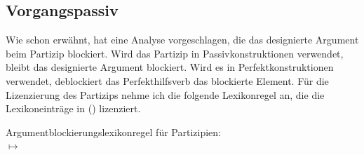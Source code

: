 \subsection{Vorgangspassiv}
\label{sec-agentive-passive-da}
\largerpage

Wie schon erwähnt, hat \citet{Haider86} eine Analyse vorgeschlagen, die das designierte Argument
beim Partizip blockiert. Wird das Partizip in Passivkonstruktionen verwendet, bleibt
das designierte Argument blockiert. Wird es in Perfektkonstruktionen verwendet,
deblockiert das Perfekthilfsverb das blockierte Element. Für die Lizenzierung
des Partizips nehme ich die folgende Lexikonregel an, die die Lexikoneinträge in () 
lizenziert.


\eas
\label{lr-da-reduction}%
Argumentblockierungslexikonregel für Partizipien:\\[1mm]
 $\mapsto$
\zs

